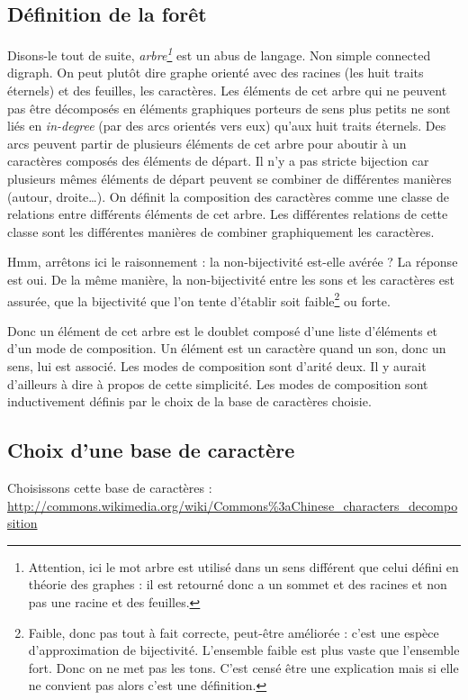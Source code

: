 \documentclass[12pt,onecolumn]{article} %
\begin{document}
\subsection{Définition de la forêt}
Disons-le tout de suite, \textsl{arbre\footnote{Attention, ici le mot arbre est utilisé dans un sens différent que celui défini en théorie des graphes : il est retourné donc a un sommet et des racines et non pas une racine et des feuilles.}} est un abus de langage. Non simple connected digraph. On peut plutôt dire graphe orienté avec des racines (les huit traits éternels) et des feuilles, les caractères. Les éléments de cet arbre qui ne peuvent pas être décomposés en éléments graphiques porteurs de sens plus petits ne sont liés en \textsl{in-degree} (par des arcs orientés vers eux) qu'aux huit traits éternels. Des arcs peuvent partir de plusieurs éléments de cet arbre pour aboutir à un caractères composés des éléments de départ. Il n'y a pas stricte bijection car plusieurs mêmes éléments de départ peuvent se combiner de différentes manières (autour, droite…). On définit la composition des caractères comme une classe de relations entre différents éléments de cet arbre. Les différentes relations de cette classe sont les différentes manières de combiner graphiquement les caractères.

Hmm, arrêtons ici le raisonnement : la non-bijectivité est-elle avérée ? La réponse est oui. De la même manière, la non-bijectivité entre les sons et les caractères est assurée, que la bijectivité que l'on tente d'établir soit faible\footnote{Faible, donc pas tout à fait correcte, peut-être améliorée : c'est une espèce d'approximation de bijectivité. L'ensemble faible est plus vaste que l'ensemble fort. Donc on ne met pas les tons. C'est censé être une explication mais si elle ne convient pas alors c'est une définition.} ou forte.

Donc un élément de cet arbre est le doublet composé d'une liste d'éléments et d'un mode de composition. Un élément est un caractère quand un son, donc un sens, lui est associé. Les modes de composition sont d'arité deux. Il y aurait d'ailleurs à dire à propos de cette simplicité. Les modes de composition sont inductivement définis par le choix de la base de caractères choisie.

\subsection{Choix d'une base de caractère}
Choisissons cette base de caractères : \url{http://commons.wikimedia.org/wiki/Commons\%3aChinese\_characters\_decomposition}
\end{document}
